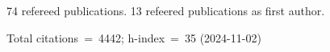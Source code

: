 74 refereed publications. 13 refeered publications as first author.

Total citations~=~4442; h-index~=~35 (2024-11-02)